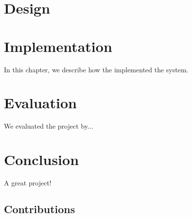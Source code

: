 \documentclass{l3proj}
\begin{document}
\chapter{Design}
\label{design}

\chapter{Implementation}
\label{impl}

In this chapter, we describe how the implemented the system.











\chapter{Evaluation}

We evaluated the project by...

\chapter{Conclusion}

A great project!

\section{Contributions}




\end{document}

